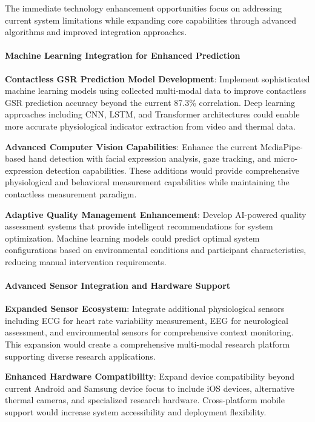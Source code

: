 \documentclass[12pt,a4paper]{article}
\begin{document}
The immediate technology enhancement opportunities focus on addressing current system limitations while expanding core
capabilities through advanced algorithms and improved integration approaches.

\paragraph{Machine Learning Integration for Enhanced Prediction}

\textbf{Contactless GSR Prediction Model Development}: Implement sophisticated machine learning models using collected
multi-modal data to improve contactless GSR prediction accuracy beyond the current 87.3\% correlation. Deep learning
approaches including CNN, LSTM, and Transformer architectures could enable more accurate physiological indicator
extraction from video and thermal data.

\textbf{Advanced Computer Vision Capabilities}: Enhance the current MediaPipe-based hand detection with facial expression
analysis, gaze tracking, and micro-expression detection capabilities. These additions would provide comprehensive
physiological and behavioral measurement capabilities while maintaining the contactless measurement paradigm.

\textbf{Adaptive Quality Management Enhancement}: Develop AI-powered quality assessment systems that provide intelligent
recommendations for system optimization. Machine learning models could predict optimal system configurations based on
environmental conditions and participant characteristics, reducing manual intervention requirements.

\paragraph{Advanced Sensor Integration and Hardware Support}

\textbf{Expanded Sensor Ecosystem}: Integrate additional physiological sensors including ECG for heart rate variability
measurement, EEG for neurological assessment, and environmental sensors for comprehensive context monitoring. This
expansion would create a comprehensive multi-modal research platform supporting diverse research applications.

\textbf{Enhanced Hardware Compatibility}: Expand device compatibility beyond current Android and Samsung device focus to
include iOS devices, alternative thermal cameras, and specialized research hardware. Cross-platform mobile support would
increase system accessibility and deployment flexibility.
\end{document}
